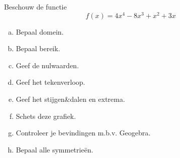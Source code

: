 \documentclass[12pt]{article}
\begin{document}
Beschouw de functie
$$f(x)=4x^4-8x^3+x^2+3x$$
\begin{enumerate}[(a)]
\item Bepaal domein.
\item Bepaal bereik.
\item Geef de nulwaarden.
\item Geef het tekenverloop.
\item Geef het stijgen\&dalen en extrema.
\item Schets deze grafiek.
\item Controleer je bevindingen m.b.v. Geogebra.
\item Bepaal alle symmetrieën.
\end{enumerate}
\end{document}
